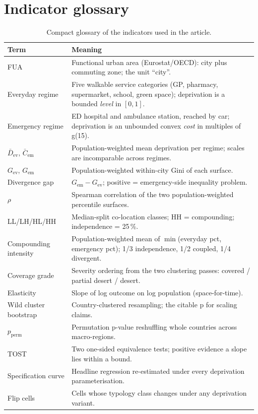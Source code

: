 \documentclass[11pt]{article}
\newcommand{\gref}{g(15)}
\begin{document}
\section{Indicator glossary}\label{si:glossary}

\begin{table}[H]
\centering
\caption{Compact glossary of the indicators used in the article.}
\small
\begin{tabular}{@{}p{}p{}@{}}
\toprule
Term & Meaning \\
\midrule
FUA & Functional urban area (Eurostat/OECD): city plus commuting zone; the unit ``city''. \\
Everyday regime & Five walkable service categories (GP, pharmacy, supermarket, school, green space); deprivation is a bounded \emph{level} in $[0,1]$. \\
Emergency regime & ED hospital and ambulance station, reached by car; deprivation is an unbounded convex \emph{cost} in multiples of \gref{}. \\
$\bar D_{\mathrm{ev}}$, $\bar C_{\mathrm{em}}$ & Population-weighted mean deprivation per regime; scales are incomparable across regimes. \\
$G_{\mathrm{ev}}$, $G_{\mathrm{em}}$ & Population-weighted within-city Gini of each surface. \\
Divergence gap & $G_{\mathrm{em}} - G_{\mathrm{ev}}$; positive = emergency-side inequality problem. \\
$\rho$ & Spearman correlation of the two population-weighted percentile surfaces. \\
LL/LH/HL/HH & Median-split co-location classes; HH = compounding; independence = 25\,\%. \\
Compounding intensity & Population-weighted mean of $\min$(everyday pct, emergency pct); 1/3 independence, 1/2 coupled, 1/4 divergent. \\
Coverage grade & Severity ordering from the two clustering passes: covered / partial desert / desert. \\
Elasticity & Slope of log outcome on log population (space-for-time). \\
Wild cluster bootstrap & Country-clustered resampling; the citable p for scaling claims. \\
$p_{\mathrm{perm}}$ & Permutation p-value reshuffling whole countries across macro-regions. \\
TOST & Two one-sided equivalence tests; positive evidence a slope lies within a bound. \\
Specification curve & Headline regression re-estimated under every deprivation parameterisation. \\
Flip cells & Cells whose typology class changes under any deprivation variant. \\
\bottomrule
\end{tabular}
\end{table}
\end{document}

